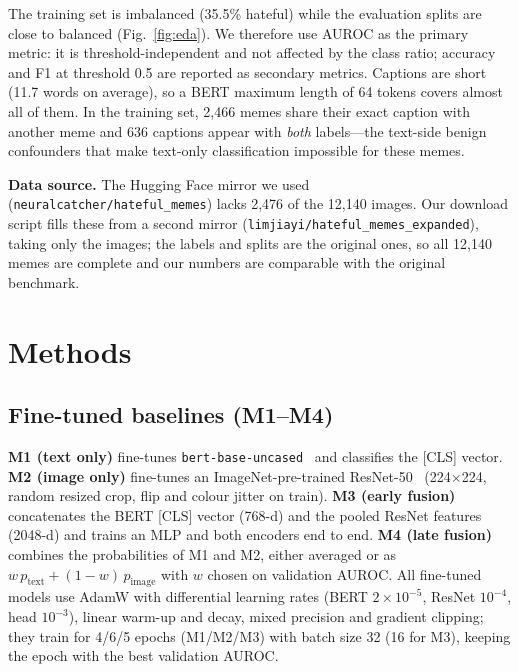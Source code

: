 \documentclass[conference]{IEEEtran}
\begin{document}
The training set is imbalanced (35.5\% hateful) while the evaluation splits are close to balanced
(Fig.~\ref{fig:eda}). We therefore use AUROC as the primary metric: it is threshold-independent and not affected by
the class ratio; accuracy and F1 at threshold 0.5 are reported as secondary metrics. Captions are short (11.7 words
on average), so a BERT maximum length of 64 tokens covers almost all of them. In the training set, 2{,}466 memes share
their exact caption with another meme and 636 captions appear with \emph{both} labels---the text-side benign
confounders that make text-only classification impossible for these memes.

\textbf{Data source.} The Hugging Face mirror we used (\texttt{neuralcatcher/hateful\_memes}) lacks 2{,}476 of the
12{,}140 images. Our download script fills these from a second mirror (\texttt{limjiayi/hateful\_memes\_expanded}),
taking only the images; the labels and splits are the original ones, so all 12{,}140 memes are complete and our
numbers are comparable with the original benchmark.

\section{Methods}
\subsection{Fine-tuned baselines (M1--M4)}
\textbf{M1 (text only)} fine-tunes \texttt{bert-base-uncased}~\cite{devlin2019} and classifies the [CLS] vector.
\textbf{M2 (image only)} fine-tunes an ImageNet-pre-trained ResNet-50~\cite{he2016} (224$\times$224, random resized
crop, flip and colour jitter on train). \textbf{M3 (early fusion)} concatenates the BERT [CLS] vector (768-d) and the
pooled ResNet features (2048-d) and trains an MLP and both encoders end to end. \textbf{M4 (late fusion)} combines
the probabilities of M1 and M2, either averaged or as $w\,p_\text{text}+(1-w)\,p_\text{image}$ with $w$ chosen on
validation AUROC. All fine-tuned models use AdamW with differential learning rates (BERT $2\!\times\!10^{-5}$,
ResNet $10^{-4}$, head $10^{-3}$), linear warm-up and decay, mixed precision and gradient clipping; they train for
4/6/5 epochs (M1/M2/M3) with batch size 32 (16 for M3), keeping the epoch with the best validation AUROC.

\end{document}
